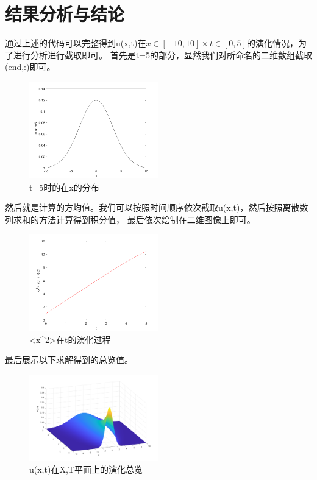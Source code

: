\documentclass[UTF8,a4paper,10pt]{ctexart}
\begin{document}
\section{结果分析与结论}
通过上述的代码可以完整得到u(x,t)在$x\in[-10,10]\times t\in [0,5]$的演化情况，为了进行分析进行截取即可。
首先是t=5的部分，显然我们对所命名的二维数组截取(end,:)即可。

	\begin{figure}[!htbp]
		\centering
		\includegraphics[width=0.5\textwidth,height=0.4\textwidth]{pictures/result1.png}
		\caption{t=5时的\phi 在x\in [-10,10]的分布} \label{p1}
	\end{figure}

  然后就是计算的方均值。我们可以按照时间顺序依次截取u(x,t)，然后按照离散数列求和的方法计算得到积分值，
  最后依次绘制在二维图像上即可。\newline

  \begin{figure}[!htbp]
		\centering
		\includegraphics[width=0.5\textwidth,height=0.4\textwidth]{pictures/result2.png}
		\caption{<x^2>在t\in[0,5]的演化过程} \label{p2}
	\end{figure}

最后展示以下求解得到的总览值。\newline

  \begin{figure}[!htbp]
		\centering
		\includegraphics[width=0.5\textwidth,height=0.4\textwidth]{pictures/result3.png}
		\caption{u(x,t)在X,T平面上的演化总览} \label{p3}
	\end{figure}
\end{document}
